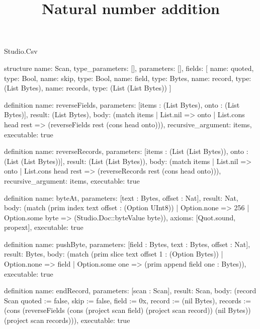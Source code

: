 \begin{lexlean}{Studio.Csv}
\title{Natural number addition}
\begin{semanticmodule}
structure{
  name: Scan,
  type_parameters: [],
  parameters: [],
  fields: [
    {name: quoted, type: Bool},
    {name: skip, type: Bool},
    {name: field, type: Bytes},
    {name: record, type: (List Bytes)},
    {name: records, type: (List (List Bytes))}
  ]
}

definition{
  name: reverseFields,
  parameters: [items : (List Bytes), onto : (List Bytes)],
  result: (List Bytes),
  body: (match items
    | List.nil => onto
    | List.cons head rest => (reverseFields rest (cons head onto))),
  recursive_argument: items,
  executable: true
}

definition{
  name: reverseRecords,
  parameters: [items : (List (List Bytes)), onto : (List (List Bytes))],
  result: (List (List Bytes)),
  body: (match items
    | List.nil => onto
    | List.cons head rest => (reverseRecords rest (cons head onto))),
  recursive_argument: items,
  executable: true
}

definition{
  name: byteAt,
  parameters: [text : Bytes, offset : Nat],
  result: Nat,
  body: (match (prim index text offset : (Option UInt8))
    | Option.none => 256
    | Option.some byte => (Studio.Doc::byteValue byte)),
  axioms: [Quot.sound, propext],
  executable: true
}

definition{
  name: pushByte,
  parameters: [field : Bytes, text : Bytes, offset : Nat],
  result: Bytes,
  body: (match (prim slice text offset 1 : (Option Bytes))
    | Option.none => field
    | Option.some one => (prim append field one : Bytes)),
  executable: true
}

definition{
  name: endRecord,
  parameters: [scan : Scan],
  result: Scan,
  body: (record Scan {quoted := false, skip := false, field := 0x, record := (nil Bytes), records := (cons (reverseFields (cons (project scan field) (project scan record)) (nil Bytes)) (project scan records))}),
  executable: true
}


\end{semanticmodule}
\end{lexlean}
